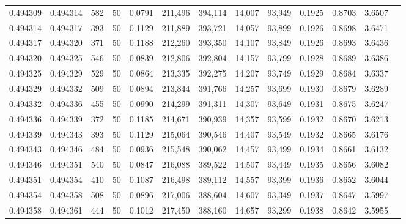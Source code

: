 \begin{tabular}{rrrrrrrrrrrrr}
0.494309 & 0.494314 &   582 &  50 &                                     0.0791 & 211,496 & 394,114 &  14,007 &  93,949 & 0.1925 & 0.8703 & 3.6507 \\
0.494314 & 0.494317 &   393 &  50 &                                     0.1129 & 211,889 & 393,721 &  14,057 &  93,899 & 0.1926 & 0.8698 & 3.6471 \\
0.494317 & 0.494320 &   371 &  50 &                                     0.1188 & 212,260 & 393,350 &  14,107 &  93,849 & 0.1926 & 0.8693 & 3.6436 \\
0.494320 & 0.494325 &   546 &  50 &                                     0.0839 & 212,806 & 392,804 &  14,157 &  93,799 & 0.1928 & 0.8689 & 3.6386 \\
0.494325 & 0.494329 &   529 &  50 &                                     0.0864 & 213,335 & 392,275 &  14,207 &  93,749 & 0.1929 & 0.8684 & 3.6337 \\
0.494329 & 0.494332 &   509 &  50 &                                     0.0894 & 213,844 & 391,766 &  14,257 &  93,699 & 0.1930 & 0.8679 & 3.6289 \\
0.494332 & 0.494336 &   455 &  50 &                                     0.0990 & 214,299 & 391,311 &  14,307 &  93,649 & 0.1931 & 0.8675 & 3.6247 \\
0.494336 & 0.494339 &   372 &  50 &                                     0.1185 & 214,671 & 390,939 &  14,357 &  93,599 & 0.1932 & 0.8670 & 3.6213 \\
0.494339 & 0.494343 &   393 &  50 &                                     0.1129 & 215,064 & 390,546 &  14,407 &  93,549 & 0.1932 & 0.8665 & 3.6176 \\
0.494343 & 0.494346 &   484 &  50 &                                     0.0936 & 215,548 & 390,062 &  14,457 &  93,499 & 0.1934 & 0.8661 & 3.6132 \\
0.494346 & 0.494351 &   540 &  50 &                                     0.0847 & 216,088 & 389,522 &  14,507 &  93,449 & 0.1935 & 0.8656 & 3.6082 \\
0.494351 & 0.494354 &   410 &  50 &                                     0.1087 & 216,498 & 389,112 &  14,557 &  93,399 & 0.1936 & 0.8652 & 3.6044 \\
0.494354 & 0.494358 &   508 &  50 &                                     0.0896 & 217,006 & 388,604 &  14,607 &  93,349 & 0.1937 & 0.8647 & 3.5997 \\
0.494358 & 0.494361 &   444 &  50 &                                     0.1012 & 217,450 & 388,160 &  14,657 &  93,299 & 0.1938 & 0.8642 & 3.5955 \\

\end{tabular}
